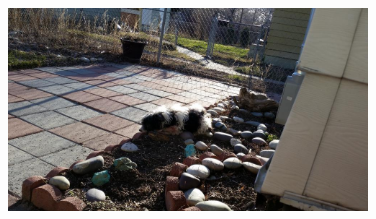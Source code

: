\documentclass[aspectratio=1610,pdftex,dvipsnames,compress,xcolor={dvipsnames}]{beamer}
\newcommand{\acs}{\acrshort} %
\begin{document}
\begin{frame}[plain]{}
    \begin{figure}
        \centering
        \includegraphics[width=0.85\textwidth]{final.jpg}
    \end{figure}
\end{frame}


%
%
%



%    
%    
\end{document}

